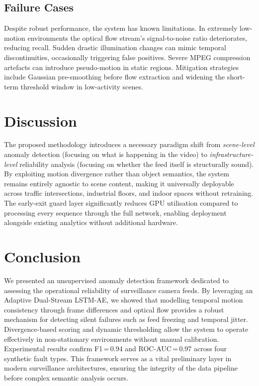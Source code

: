 \documentclass[runningheads]{llncs}
\begin{document}
\subsection{Failure Cases}
Despite robust performance, the system has known limitations. In
extremely low-motion environments the optical flow stream's
signal-to-noise ratio deteriorates, reducing recall. Sudden drastic
illumination changes can mimic temporal discontinuities, occasionally
triggering false positives. Severe MPEG compression artefacts can
introduce pseudo-motion in static regions. Mitigation strategies include
Gaussian pre-smoothing before flow extraction and widening the short-term
threshold window in low-activity scenes.

\section{Discussion}
The proposed methodology introduces a necessary paradigm shift from
\textit{scene-level} anomaly detection (focusing on what is happening in
the video) to \textit{infrastructure-level} reliability analysis (focusing
on whether the feed itself is structurally sound). By exploiting motion
divergence rather than object semantics, the system remains entirely
agnostic to scene content, making it universally deployable across traffic
intersections, industrial floors, and indoor spaces without retraining.
The early-exit guard layer significantly reduces GPU utilisation
compared to processing every sequence through the full network, enabling
deployment alongside existing analytics without additional hardware.

\section{Conclusion}
We presented an unsupervised anomaly detection framework dedicated to
assessing the operational reliability of surveillance camera feeds. By
leveraging an Adaptive Dual-Stream LSTM-AE, we showed that modelling
temporal motion consistency through frame differences and optical flow
provides a robust mechanism for detecting silent failures such as feed
freezing and temporal jitter. Divergence-based scoring and dynamic
thresholding allow the system to operate effectively in non-stationary
environments without manual calibration. Experimental results confirm
F1\,=\,0.94 and ROC-AUC\,=\,0.97 across four synthetic fault types.
This framework serves as a vital preliminary layer in modern surveillance
architectures, ensuring the integrity of the data pipeline before complex
semantic analysis occurs.
\end{document}
